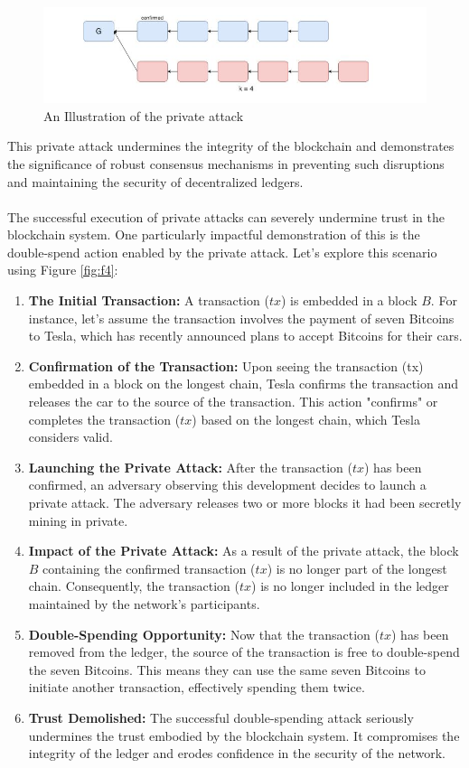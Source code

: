 \begin{center}
    \begin{figure}[h!]
        \centering
        \includegraphics[width=0.6\linewidth]{Fig/03/F3}
        \caption{An Illustration of the private attack}
        \label{fig:f3}
    \end{figure}
\end{center}
This private attack undermines the integrity of the blockchain and demonstrates the significance of robust consensus mechanisms in preventing such disruptions and maintaining the security of decentralized ledgers.\\\\
The successful execution of private attacks can severely undermine trust in the blockchain system. One particularly impactful demonstration of this is the double-spend action enabled by the private attack. Let's explore this scenario using Figure \ref{fig:f4}:
\begin{enumerate}
    \item \textbf{The Initial Transaction:} A transaction ($tx$) is embedded in a block $B$. For instance, let's assume the transaction involves the payment of seven Bitcoins to Tesla, which has recently announced plans to accept Bitcoins for their cars.
    \item \textbf{Confirmation of the Transaction:} Upon seeing the transaction (tx) embedded in a block on the longest chain, Tesla confirms the transaction and releases the car to the source of the transaction. This action "confirms" or completes the transaction ($tx$) based on the longest chain, which Tesla considers valid.
    \item \textbf{Launching the Private Attack:} After the transaction ($tx$) has been confirmed, an adversary observing this development decides to launch a private attack. The adversary releases two or more blocks it had been secretly mining in private.
    \item \textbf{Impact of the Private Attack:} As a result of the private attack, the block $B$ containing the confirmed transaction ($tx$) is no longer part of the longest chain. Consequently, the transaction ($tx$) is no longer included in the ledger maintained by the network's participants.
    \item \textbf{Double-Spending Opportunity:} Now that the transaction ($tx$) has been removed from the ledger, the source of the transaction is free to double-spend the seven Bitcoins. This means they can use the same seven Bitcoins to initiate another transaction, effectively spending them twice.
    \item \textbf{Trust Demolished:} The successful double-spending attack seriously undermines the trust embodied by the blockchain system. It compromises the integrity of the ledger and erodes confidence in the security of the network.
\end{enumerate}
